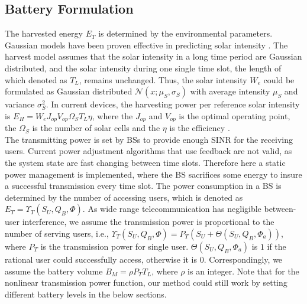 \documentclass[journal,12pt,draftclsnofoot,onecolumn]{IEEEtran}
\begin{document}
\subsection{Battery Formulation}
The harvested energy \(E_T\) is determined by the environmental parameters.
Gaussian models have been proven effective in predicting solar intensity \cite{gaussian,data}.
The harvest model assumes that the solar intensity in a long time period are Gaussian distributed, and the solar intensity during one single time slot, the length of which denoted as \(T_L\), remains unchanged.
Thus, the solar intensity \(W_e\) could be formulated as
Gaussian distributed \(\mathcal{N}\left(x;\mu_S,\sigma_S\right)\)
with average intensity \(\mu_S\) and variance \(\sigma_S^2\).
In current devices,
the harvesting power per reference solar intensity is
\(E_H = W_eJ_{op}V_{op}\Omega_ST_L\eta\), where the \(J_{op}\) and \(V_{op}\) is the optimal operating point,
the \(\Omega_S\) is the number of solar cells and the \(\eta\) is the efficiency \cite{physic}.\\
\indent The transmitting power is set by BSs to provide enough SINR for the receiving users.
Current power adjustment algorithms that use feedback are not valid,
as the system state are fast changing between time slots.
Therefore here a static power management is implemented,
where the BS sacrifices some energy to insure a successful transmission every time slot.
The power consumption in a BS is determined by the number of accessing users,
which is denoted as \(E_T = \Upsilon_T(S_U, Q_B, \Phi)\).
As wide range telecommunication has negligible between-user interference,
we assume the transmission power is proportional to the number of serving users, i.e.,
\(\Upsilon_T(S_U, Q_B, \Phi) = P_T(S_U + \Theta(S_U,Q_B,\Phi_a))\), where \(P_T\) is the transmission power for single user.
\(\Theta(S_U,Q_B,\Phi_a)\) is \(1\) if the rational user could successfully access, otherwise it is \(0\).
Correspondingly, we assume the battery volume \(B_M = \rho P_TT_L\), where \(\rho\) is an integer.
Note that for the nonlinear transmission power function,
our method could still work by setting different battery levels in the below sections.
\end{document}
